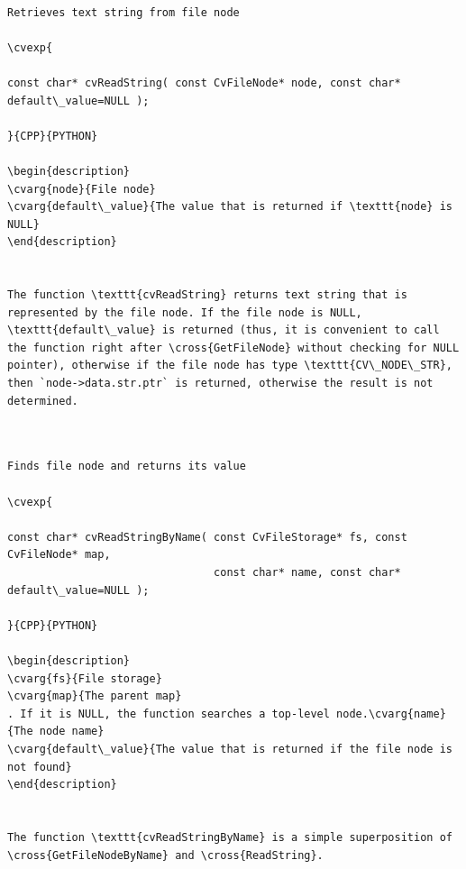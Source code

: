 \begin{verbatim}

Retrieves text string from file node

\cvexp{

const char* cvReadString( const CvFileNode* node, const char* default\_value=NULL );

}{CPP}{PYTHON}

\begin{description}
\cvarg{node}{File node}
\cvarg{default\_value}{The value that is returned if \texttt{node} is NULL}
\end{description}


The function \texttt{cvReadString} returns text string that is represented by the file node. If the file node is NULL, \texttt{default\_value} is returned (thus, it is convenient to call the function right after \cross{GetFileNode} without checking for NULL pointer), otherwise if the file node has type \texttt{CV\_NODE\_STR}, then `node->data.str.ptr` is returned, otherwise the result is not determined.


\end{verbatim}
\label{ReadStringByName}
\begin{verbatim}

Finds file node and returns its value

\cvexp{

const char* cvReadStringByName( const CvFileStorage* fs, const CvFileNode* map,
                                const char* name, const char* default\_value=NULL );

}{CPP}{PYTHON}

\begin{description}
\cvarg{fs}{File storage}
\cvarg{map}{The parent map}
. If it is NULL, the function searches a top-level node.\cvarg{name}{The node name}
\cvarg{default\_value}{The value that is returned if the file node is not found}
\end{description}


The function \texttt{cvReadStringByName} is a simple superposition of \cross{GetFileNodeByName} and \cross{ReadString}.


\end{verbatim}
\label{Read}
